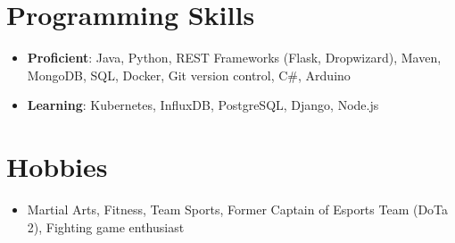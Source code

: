 \documentclass[letterpaper,11pt]{article}
\newcommand{\resumeSubHeadingListStart}{\begin{itemize}[leftmargin=*]}
\newcommand{\resumeSubHeadingListEnd}{\end{itemize}}
\begin{document}
%
\section{Programming Skills}
  \resumeSubHeadingListStart
	\item{
	\textbf{Proficient}{: Java, Python, REST Frameworks (Flask, Dropwizard), Maven, MongoDB, SQL, Docker, Git version control, C\#, Arduino}
    	}
	\item{
		\textbf{Learning}{: Kubernetes, InfluxDB, PostgreSQL, Django, Node.js}
	}
  \resumeSubHeadingListEnd

\section{Hobbies}
	\resumeSubHeadingListStart
	\item{
	\textbf{}{Martial Arts, Fitness, Team Sports, Former Captain of Esports Team (DoTa 2), Fighting game enthusiast }
	}
	\resumeSubHeadingListEnd
\end{document}
